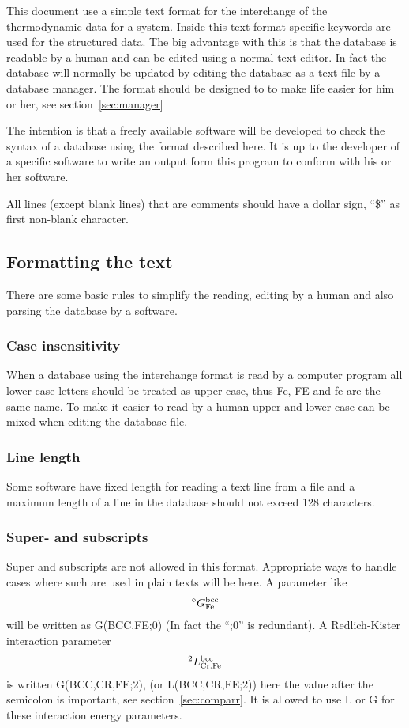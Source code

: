 \documentclass[12pt]{article}
\begin{document}
This document use a simple text format for the interchange of the
thermodynamic data for a system.  Inside this text format specific
keywords are used for the structured data.  The big advantage with
this is that the database is readable by a human and can be edited
using a normal text editor.  In fact the database will normally be
updated by editing the database as a text file by a database manager.
The format should be designed to to make life easier for him or her,
see section~\ref{sec:manager}

The intention is that a freely available software will be developed to
check the syntax of a database using the format described here.  It is
up to the developer of a specific software to write an output form
this program to conform with his or her software.

All lines (except blank lines) that are comments should have a dollar
sign, ``\$'' as first non-blank character.

\subsection{Formatting the text}

There are some basic rules to simplify the reading, editing by a human
and also parsing the database by a software.

\subsubsection{Case insensitivity}

When a database using the interchange format is read by a computer
program all lower case letters should be treated as upper case, thus
Fe, FE and fe are the same name.  To make it easier to read by a human
upper and lower case can be mixed when editing the database file.

\subsubsection{Line length}

Some software have fixed length for reading a text line from a file
and a maximum length of a line in the database should not exceed 128
characters.

\subsubsection{Super- and subscripts}

Super and subscripts are not allowed in this format.  Appropriate ways
to handle cases where such are used in plain texts will be here.  A
parameter like
\begin{eqnarray}
^{\circ}G^{\rm bcc}_{\rm Fe} \nonumber
\end{eqnarray}
will be written as G(BCC,FE;0) (In fact the ``;0'' is redundant).  A
Redlich-Kister interaction parameter
\begin{eqnarray}
^{2}L^{\rm bcc}_{\rm Cr.Fe} \nonumber
\end{eqnarray}
is written G(BCC,CR,FE;2), (or L(BCC,CR,FE;2)) here the value after
the semicolon is important, see section~\ref{sec:comparr}.  It is
allowed to use L or G for these interaction energy parameters.
\end{document}
